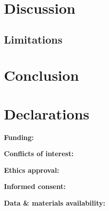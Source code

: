 \documentclass[11pt,a4paper]{article}
\begin{document}
\section{Discussion}
\label{sec:discussion}

\subsection{Limitations}

\section{Conclusion}
\label{sec:conclusion}

\section*{Declarations}

\noindent\textbf{Funding:} %

\noindent\textbf{Conflicts of interest:} %

\noindent\textbf{Ethics approval:} %

\noindent\textbf{Informed consent:} %

\noindent\textbf{Data \& materials availability:} %
\end{document}
